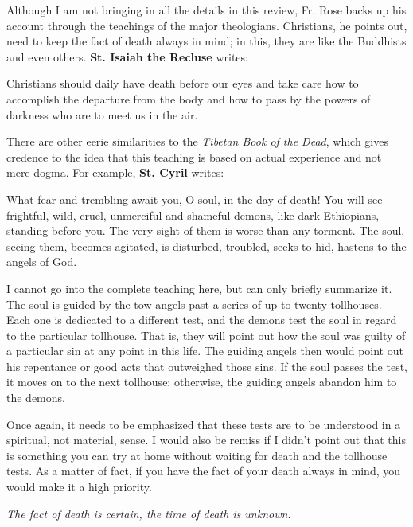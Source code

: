Although I am not bringing in all the details in this review, Fr. Rose backs up his account through the teachings of the major theologians. Christians, he points out, need to keep the fact of death always in mind; in this, they are like the Buddhists and even others. \textbf{St. Isaiah the Recluse} writes:

\begin{quotex}
Christians should daily have death before our eyes and take care how to accomplish the departure from the body and how to pass by the powers of darkness who are to meet us in the air. 

\end{quotex}
There are other eerie similarities to the \textit{Tibetan Book of the Dead}, which gives credence to the idea that this teaching is based on actual experience and not mere dogma. For example, \textbf{St. Cyril} writes:

\begin{quotex}
What fear and trembling await you, O soul, in the day of death! You will see frightful, wild, cruel, unmerciful and shameful demons, like dark Ethiopians, standing before you. The very sight of them is worse than any torment. The soul, seeing them, becomes agitated, is disturbed, troubled, seeks to hid, hastens to the angels of God. 

\end{quotex}
I cannot go into the complete teaching here, but can only briefly summarize it. The soul is guided by the tow angels past a series of up to twenty tollhouses. Each one is dedicated to a different test, and the demons test the soul in regard to the particular tollhouse. That is, they will point out how the soul was guilty of a particular sin at any point in this life. The guiding angels then would point out his repentance or good acts that outweighed those sins. If the soul passes the test, it moves on to the next tollhouse; otherwise, the guiding angels abandon him to the demons.

Once again, it needs to be emphasized that these tests are to be understood in a spiritual, not material, sense. I would also be remiss if I didn't point out that this is something you can try at home without waiting for death and the tollhouse tests. As a matter of fact, if you have the fact of your death always in mind, you would make it a high priority.

\textit{The fact of death is certain, the time of death is unknown.}



